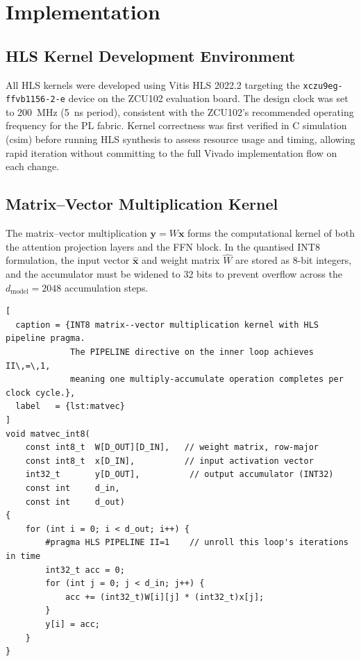 %

\chapter{Implementation}
\label{ch:implementation}

\section{HLS Kernel Development Environment}
\label{sec:hls_env}

All HLS kernels were developed using Vitis HLS 2022.2 targeting the
\texttt{xczu9eg-ffvb1156-2-e} device on the ZCU102 evaluation board.
The design clock was set to \SI{200}{\mega\hertz} (\SI{5}{\nano\second}
period), consistent with the ZCU102's recommended operating frequency for
the PL fabric. Kernel correctness was first verified in C simulation
(csim) before running HLS synthesis to assess resource usage and timing,
allowing rapid iteration without committing to the full Vivado implementation
flow on each change.

\section{Matrix--Vector Multiplication Kernel}
\label{sec:matvec_kernel}

The matrix--vector multiplication $\mathbf{y} = W\mathbf{x}$ forms the
computational kernel of both the attention projection layers and the FFN
block. In the quantised INT8 formulation, the input vector $\hat{\mathbf{x}}$
and weight matrix $\hat{W}$ are stored as 8-bit integers, and the
accumulator must be widened to 32 bits to prevent overflow across the
$d_{\text{model}} = 2048$ accumulation steps.

\begin{lstlisting}[
  caption = {INT8 matrix--vector multiplication kernel with HLS pipeline pragma.
             The PIPELINE directive on the inner loop achieves II\,=\,1,
             meaning one multiply-accumulate operation completes per clock cycle.},
  label   = {lst:matvec}
]
void matvec_int8(
    const int8_t  W[D_OUT][D_IN],   // weight matrix, row-major
    const int8_t  x[D_IN],          // input activation vector
    int32_t       y[D_OUT],          // output accumulator (INT32)
    const int     d_in,
    const int     d_out)
{
    for (int i = 0; i < d_out; i++) {
        #pragma HLS PIPELINE II=1    // unroll this loop's iterations in time
        int32_t acc = 0;
        for (int j = 0; j < d_in; j++) {
            acc += (int32_t)W[i][j] * (int32_t)x[j];
        }
        y[i] = acc;
    }
}
\end{lstlisting}

